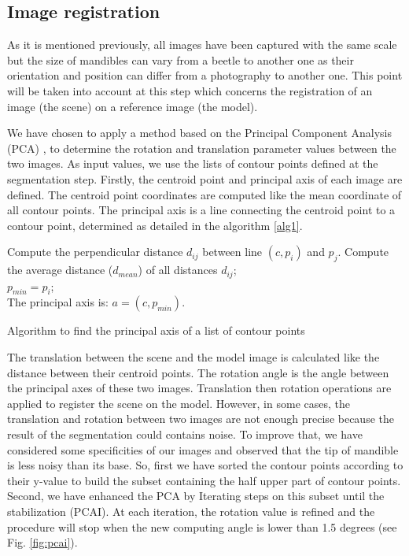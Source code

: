 \documentclass[twoside,twocolumn,10pt]{article}
\begin{document}
\subsection{Image registration}

As it is mentioned previously, all images have been captured with the
same scale but the size of mandibles can vary from a beetle to another
one as their orientation and position can differ from a
photography to another one. This point will be taken into account at
this step which concerns the registration of
an image (the scene) on a reference image (the model).

We have chosen to apply a method based on the Principal Component Analysis (PCA) \cite{bsspca}, \cite{shlens2014tutorial} to determine the rotation and translation parameter values between the two images.
As input values, we use the lists of contour points defined at the segmentation step.
Firstly, the centroid point and principal axis of each image are defined.
The centroid point coordinates are computed like the mean coordinate of all contour points.
The principal axis is a line connecting the centroid point to a
contour point, determined as detailed in the algorithm \ref{alg1}.

\begin{algorithm}
	{
		{
			{
				Compute the perpendicular distance $d_{ij}$ between line $(c,p_i)$ and $p_j$.
			}
		}
		Compute the average distance ($d_{mean}$) of all distances $d_{ij}$;\\

		{
			$p_{min} = p_i$;\\
		}
	}
	The principal axis is: $a = (c,p_{min})$.
	\caption{Algorithm to find the principal axis of a list of contour points}
	\label{alg1}
\end{algorithm}

The translation between the scene and the model image is calculated like the distance between their centroid
points. The rotation angle is the angle between the principal axes of
these two images. Translation then rotation operations are applied to
register the scene on the model. However, in some cases, the
translation and rotation between two images are
not enough precise because the result of the segmentation could
contains noise. To improve that, we have considered some specificities of our
 images and observed that the tip of mandible is less
 noisy than its base. So, first we have sorted the contour
 points according to their y-value to build the subset
 containing the half upper part of contour points. Second, we have
 enhanced the PCA by Iterating steps on this subset until the stabilization
 (PCAI). At each iteration, the rotation value is refined and the
 procedure will stop when the new computing angle is lower than 1.5 degrees (see
 Fig. \ref{fig:pcai}).
\end{document}
